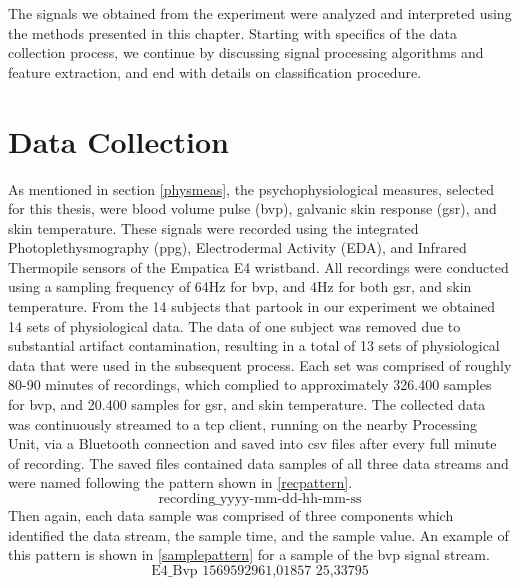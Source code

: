 The signals we obtained from the experiment were analyzed and interpreted using the methods presented in this chapter. Starting with specifics of the data collection process, we continue by discussing signal processing algorithms and feature extraction, and end with details on classification procedure.

\section{Data Collection}
As mentioned in section \ref{physmeas}, the psychophysiological measures, selected for this thesis, were blood volume pulse (\gls{bvp}), galvanic skin response (\gls{gsr}), and skin temperature. These signals were recorded using the integrated Photoplethysmography (\gls{ppg}), Electrodermal Activity (EDA), and Infrared Thermopile sensors of the Empatica E4 wristband. All recordings were conducted using a sampling frequency of 64Hz for \gls{bvp}, and 4Hz for both \gls{gsr}, and skin temperature. 
From the 14 subjects that partook in our experiment we obtained 14 sets of physiological data. The data of one subject was removed due to substantial artifact contamination, resulting in a total of 13 sets of physiological data that were used in the subsequent process. Each set was comprised of roughly 80-90 minutes of recordings, which complied to approximately 326.400 samples for \gls{bvp}, and 20.400 samples for \gls{gsr}, and skin temperature. 
The collected data was continuously streamed to a \gls{tcp} client, running on the nearby Processing Unit, via a Bluetooth connection and saved into \gls{csv} files after every full minute of recording. The saved files contained data samples of all three data streams and were named following the pattern shown in \ref{recpattern}.
\begin{equation} \label{recpattern}
\text{recording\_yyyy-mm-dd-hh-mm-ss}
\end{equation}
Then again, each data sample was comprised of three components which identified the data stream, the sample time, and the sample value. An example of this pattern is shown in \ref{samplepattern} for a sample of the \gls{bvp} signal stream. 
\begin{equation}\label{samplepattern}
\text{E4\_Bvp 1569592961,01857 25,33795}
\end{equation}

